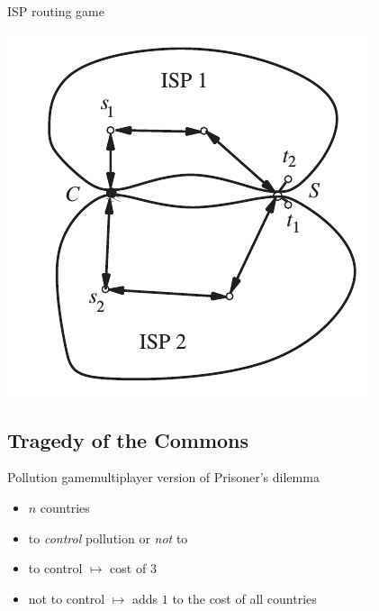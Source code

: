 \documentclass{beamer}
\begin{document}
\begin{frame}{ISP routing game}
  \begin{center}
    \includegraphics[width=\textwidth,height=0.8\textheight,keepaspectratio]{img/isp.png}
  \end{center}
\end{frame}

\subsection{Tragedy of the Commons}

\begin{frame}{Pollution game}{multiplayer version of Prisoner's dilemma}
  \pause
  \begin{itemize}
    \item $n$ countries
      \pause
    \item to \emph{control} pollution or \emph{not} to
      \pause
    \item to control $\mapsto$ cost of $3$ 
      \pause
    \item not to control $\mapsto$ adds $1$ to the cost of all countries
      \pause
  \end{itemize}
\end{frame}
\end{document}
